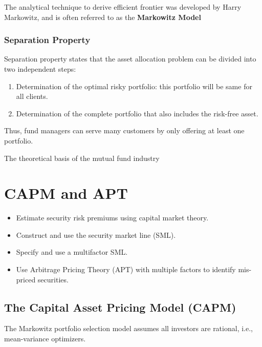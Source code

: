 \documentclass[
]{book}
\providecommand{\tightlist}{%
  \setlength{\itemsep}{0pt}\setlength{\parskip}{0pt}}
\begin{document}
The analytical technique to derive efficient frontier was developed by Harry Markowitz, and is often referred to as the \textbf{Markowitz Model}

\hypertarget{separation-property}{%
\subsection{Separation Property}\label{separation-property}}

Separation property states that the asset allocation problem can be divided into two independent steps:

\begin{enumerate}
\def\labelenumi{\arabic{enumi}.}
\item
  Determination of the optimal risky portfolio: this portfolio will be same for all clients.
\item
  Determination of the complete portfolio that also includes the risk-free asset.
\end{enumerate}

Thus, fund managers can serve many customers by only offering at least one portfolio.

The theoretical basis of the mutual fund industry

\hypertarget{ch4}{%
\chapter{CAPM and APT}\label{ch4}}

\begin{itemize}
\tightlist
\item
  Estimate security risk premiums using capital market theory.
\item
  Construct and use the security market line (SML).
\item
  Specify and use a multifactor SML.
\item
  Use Arbitrage Pricing Theory (APT) with multiple factors to identify mis-priced securities.
\end{itemize}

\hypertarget{the-capital-asset-pricing-model-capm}{%
\section{The Capital Asset Pricing Model (CAPM)}\label{the-capital-asset-pricing-model-capm}}

The Markowitz portfolio selection model assumes all investors are rational, i.e., mean-variance optimizers.
\end{document}
